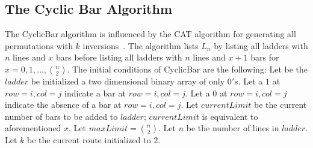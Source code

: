 \subsection{The Cyclic Bar Algorithm}

The {\sc CyclicBar} algorithm is influenced by the CAT algorithm for generating all permutations with $k$ inversions~\cite{A26}.
The algorithm lists $L_{n}$ by listing all ladders with $n$ lines and $x$ bars before listing all ladders with 
$n$ lines and $x+1$ bars for $x=0,1, \dots ,{n \choose 2}$. The initial conditions of {\sc CyclicBar} are the following: 
Let be the $ladder$ be initialized a two dimensional binary array of only $0's$.
 Let a $1$ at $row=i,col=j$ 
indicate a bar at  $row=i,col=j$. Let a $0$ at $row=i,col=j$ 
indicate the absence of a bar at  $row=i,col=j$. Let $currentLimit$
be the current number of bars to be added to $ladder$; $currentLimit$ is equivalent to aforementioned $x$.
Let $maxLimit={n \choose 2}$. Let $n$ be the number of lines in $ladder$. Let $k$ be the current route initialized 
to $2$. 


